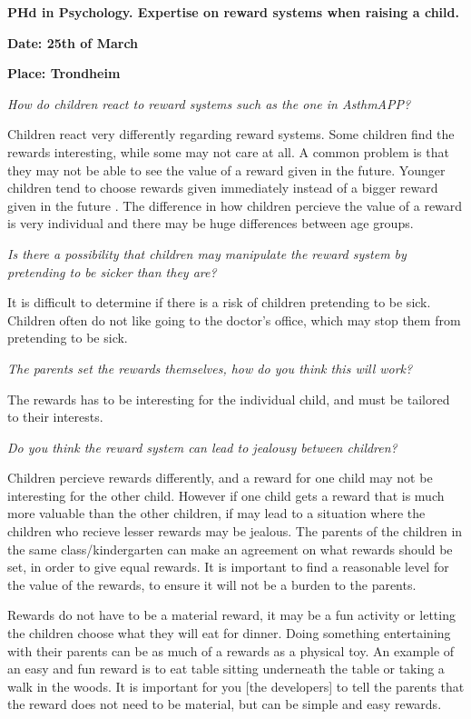 \textbf{PHd in Psychology. Expertise on reward systems when raising a child.} 

\textbf{Date: 25th of March}

\textbf{Place: Trondheim}

\emph{How do children react to reward systems such as the one in AsthmAPP?}

Children react very differently regarding reward systems. Some children find the rewards interesting, while some may not care at all. A common problem is that they may not be able to see the value of a reward given in the future. Younger children tend to choose rewards given immediately instead of a bigger reward given in the future \cite{mischel1972cognitive}.
The difference in how children percieve the value of a reward is very individual and there may be huge differences between age groups. 


\emph{Is there a possibility that children may manipulate the reward system by pretending to be sicker than they are?}

It is difficult to determine if there is a risk of children pretending to be sick. Children often do not like going to the doctor's office, which may stop them from pretending to be sick.


\emph{The parents set the rewards themselves, how do you think this will work?}

The rewards has to be interesting for the individual child, and must be tailored to their interests. 

\emph{Do you think the reward system can lead to jealousy between children?}

Children percieve rewards differently, and a reward for one child may not be interesting for the other child. However if one child gets a reward that is much more valuable than the other children, if may lead to a situation where the children who recieve lesser rewards may be jealous. The parents of the children in the same class/kindergarten can make an agreement on what rewards should be set, in order to give equal rewards. It is important to find a reasonable level for the value of the rewards, to ensure it will not be a burden to the parents.

Rewards do not have to be a material reward, it may be a fun activity or letting the children choose what they will eat for dinner. Doing something entertaining with their parents can be as much of a rewards as a physical toy. An example of an easy and fun reward is to eat table sitting underneath the table or taking a walk in the woods. It is important for you [the developers] to tell the parents that the reward does not need to be material, but can be simple and easy rewards.


